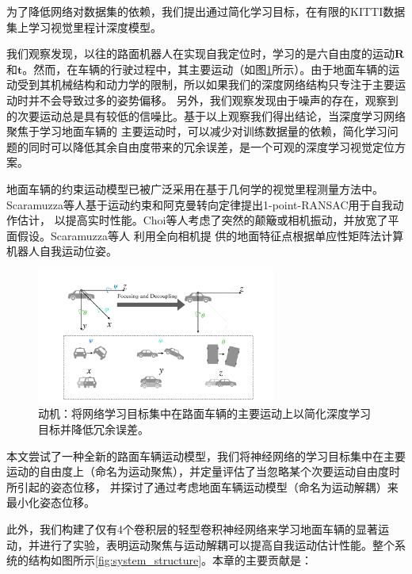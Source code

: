 为了降低网络对数据集的依赖，我们提出通过简化学习目标，在有限的KITTI数据集上学习视觉里程计深度模型。

我们观察发现，以往的路面机器人在实现自我定位时，学习的是六自由度的运动$\textbf{R}$和$\textbf{t}$。然而，在车辆的行驶过程中，其主要运动（如图\ref{fig:car_simplify}所示）。由于地面车辆的运动受到其机械结构和动力学的限制，所以如果我们的深度网络结构只专注于主要运动时并不会导致过多的姿势偏移。
另外，我们观察发现由于噪声的存在，观察到的次要运动总是具有较低的信噪比。基于以上观察我们得出结论，当深度学习网络聚焦于学习地面车辆的
主要运动时，可以减少对训练数据量的依赖，简化学习问题的同时可以降低其余自由度带来的冗余误差，是一个可观的深度学习视觉定位方案。

地面车辆的约束运动模型已被广泛采用在基于几何学的视觉里程测量方法中。%
Scaramuzza等人\cite{scaramuzza2009real}基于运动约束和阿克曼转向定律\cite{siegwart2011introduction}提出1-point-RANSAC用于自我动作估计，
以提高实时性能。Choi等人\cite{choi2015simplified}考虑了突然的颠簸或相机振动，并放宽了平面假设。Scaramuzza等人 \cite{4625958}利用全向相机提
供的地面特征点根据单应性矩阵法计算机器人自我运动位姿。

\begin{figure}[h]
    \centering
    \includegraphics[width=0.7\textwidth]{datavo/car_simplify.pdf}
    \caption{动机：将网络学习目标集中在路面车辆的主要运动上以简化深度学习目标并降低冗余误差。}
    \label{fig:car_simplify}
\end{figure}

本文尝试了一种全新的路面车辆运动模型，我们将神经网络的学习目标集中在主要运动的自由度上（命名为运动聚焦），并定量评估了当忽略某个次要运动自由度时所引起的姿态位移，
并探讨了通过考虑地面车辆运动模型（命名为运动解耦）来最小化姿态位移。

此外，我们构建了仅有4个卷积层的轻型卷积神经网络来学习地面车辆的显著运动，并进行了实验，表明运动聚焦与运动解耦可以提高自我运动估计性能。整个系统的结构如图所示\ref{fig:system_structure}。本章的主要贡献是：

